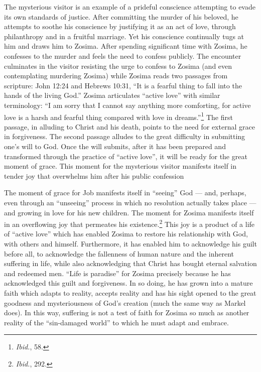 The mysterious visitor is an example of a prideful conscience attempting to evade its own standards of justice. After committing the murder of his beloved, he attempts to soothe his conscience by justifying it as an act of love, through philanthropy and in a fruitful marriage. Yet his conscience continually tugs at him and draws him to Zosima. After spending significant time with Zosima, he confesses to the murder and feels the need to confess publicly. The encounter culminates in the visitor resisting the urge to confess to Zosima (and even contemplating murdering Zosima) while Zosima reads two passages from scripture: John 12:24 and Hebrews 10:31, ``It is a fearful thing to fall into the hands of the living God.'' Zosima articulates ``active love'' with similar terminology: ``I am sorry that I cannot say anything more comforting, for active love is a harsh and fearful thing compared with love in dreams.''\footnote{\emph{Ibid.}, 58.} The first passage, in alluding to Christ and his death, points to the need for external grace in forgiveness. The second passage alludes to the great difficulty in submitting one's will to God. Once the will submits, after it has been prepared and transformed through the practice of ``active love'', it will be ready for the great moment of grace. This moment for the mysterious visitor manifests itself in tender joy that overwhelms him after his public confession

The moment of grace for Job manifests itself in ``seeing'' God --- and, perhaps, even through an ``unseeing'' process in which no resolution actually takes place --- and growing in love for his new children. The moment for Zosima manifests itself in an overflowing joy that permeates his existence.\footnote{\emph{Ibid.}, 292.} This joy is a product of a life of ``active love'' which has enabled Zosima to restore his relationship with God, with others and himself. Furthermore, it has enabled him to acknowledge his guilt before all, to acknowledge the fallenness of human nature and the inherent suffering in life, while also acknowledging that Christ has bought eternal salvation and redeemed men. ``Life is paradise'' for Zosima precisely because he has acknowledged this guilt and forgiveness. In so doing, he has grown into a mature faith which adapts to reality, accepts reality and has his sight opened to the great goodness and mysteriousness of God's creation (much the same way as Markel does). In this way, suffering is not a test of faith for Zosima so much as another reality of the ``sin-damaged world'' to which he must adapt and embrace. 

